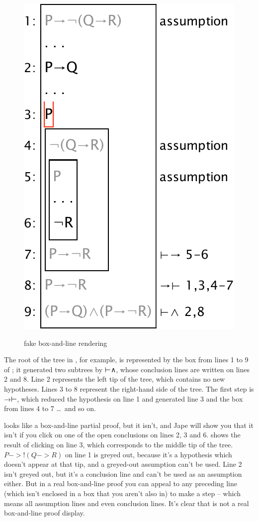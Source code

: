 \documentclass[11pt]{article}
\renewcommand{\picscale}{0.6}
\begin{document}
\begin{figure}
{\includegraphics[scale=\picscale]{pics/firsttreeboxedgreyed}
\label{fig:firsttreeboxedgreyed}}
\caption{fake box-and-line rendering}
\label{fig:firsttreeboxedall}
\end{figure}

The root of the tree in , for example, is represented by the box from lines 1 to 9 of ; it generated two subtrees by ⊢∧, whose conclusion lines are written on lines 2 and 8. Line 2 represents the left tip of the tree, which contains no new hypotheses. Lines 3 to 8 represent the right-hand side of the tree. The first step is  
→⊢, which reduced the hypothesis on line 1 and generated line 3 and the box from lines 4 to 7 \dots\ and so on.

 looks like a box-and-line partial proof, but it isn't, and Jape will show you that it isn't if you click on one of the open conclusions on lines 2, 3 and 6.  shows the result of clicking on line 3, which corresponds to the middle tip of the tree. $P->!(Q->R)$ on line 1 is greyed out, because it's a hypothesis which doesn't appear at that tip, and a greyed-out assumption can't be used. Line 2 isn't greyed out, but it's a conclusion line and can't be used as an assumption either. But in a real box-and-line proof you can appeal to any preceding line (which isn't enclosed in a box that you aren't also in) to make a step -- which means all assumption lines and even conclusion lines. It's clear that  is not a real box-and-line proof display.
\end{document}
